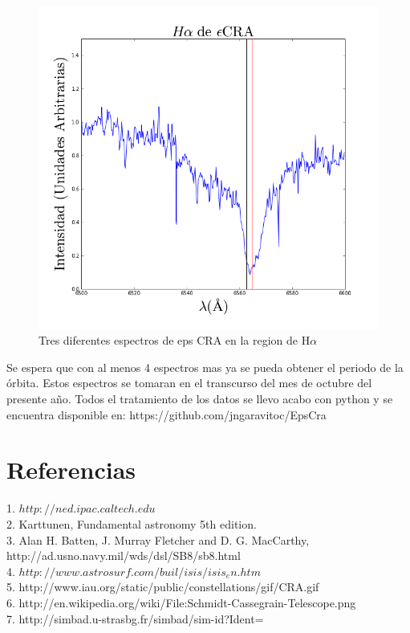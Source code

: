 \documentclass[Proceedings]{ascelike}
\begin{document}
\begin{figure}
\includegraphics[scale=0.33]{ha3.png}
\caption{Tres diferentes espectros de eps CRA en la region de H$\alpha$\label{ha}}
\end{figure}

Se espera que con al menos 4 espectros mas ya se pueda obtener el periodo de la \'orbita. 
Estos espectros se tomaran en el transcurso del mes de octubre del presente año. 
Todos el tratamiento de los datos se llevo acabo con python y se encuentra disponible en:
https://github.com/jngaravitoc/EpsCra



\section{Referencias}

1. $http://ned.ipac.caltech.edu$  \\
2. Karttunen, Fundamental astronomy 5th edition.\\
3. Alan H. Batten, J. Murray Fletcher and D. G. MacCarthy, http://ad.usno.navy.mil/wds/dsl/SB8/sb8.html\\
4. $http://www.astrosurf.com/buil/isis/isis_en.htm$\\
5. http://www.iau.org/static/public/constellations/gif/CRA.gif \\
6. http://en.wikipedia.org/wiki/File:Schmidt-Cassegrain-Telescope.png \\
7. http://simbad.u-strasbg.fr/simbad/sim-id?Ident=%
\end{document}
